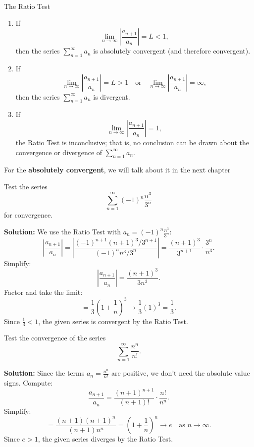 \documentclass[12pt]{article}
\theoremstyle{beautifulthm}
\begin{document}
\begin{mytheorem}{The Ratio Test}{}
    \begin{enumerate}
    \item[(i)] If 
    \[
    \lim_{n \to \infty} \left| \frac{a_{n+1}}{a_n} \right| = L < 1,
    \]
    then the series $\sum_{n=1}^\infty a_n$ is absolutely convergent (and therefore convergent).

    \item[(ii)] If 
    \[
    \lim_{n \to \infty} \left| \frac{a_{n+1}}{a_n} \right| = L > 1 \quad \text{or} \quad \lim_{n \to \infty} \left| \frac{a_{n+1}}{a_n} \right| = \infty,
    \]
    then the series $\sum_{n=1}^\infty a_n$ is divergent.

    \item[(iii)] If 
    \[
    \lim_{n \to \infty} \left| \frac{a_{n+1}}{a_n} \right| = 1,
    \]
    the Ratio Test is inconclusive; that is, no conclusion can be drawn about the convergence or divergence of $\sum_{n=1}^\infty a_n$.
\end{enumerate}
\end{mytheorem}

For the \textbf{absolutely convergent}, we will talk about it in the next chapter

\begin{tcolorbox}[colback=examplebg, colframe=red!75!black, title=\textbf{EXAMPLE 1: Using the Ratio Test}, fonttitle=\bfseries, sharp corners]
Test the series 
\[
\sum_{n=1}^\infty (-1)^n \frac{n^3}{3^n}
\]
for convergence.


\tcblower
\textbf{Solution:} 
We use the Ratio Test with $a_n = (-1)^n \frac{n^3}{3^n}$:
\[
\left| \frac{a_{n+1}}{a_n} \right| = \left| \frac{(-1)^{n+1}(n+1)^3 / 3^{n+1}}{(-1)^n n^3 / 3^n} \right| = \frac{(n+1)^3}{3^{n+1}} \cdot \frac{3^n}{n^3}.
\]
Simplify:
\[
\left| \frac{a_{n+1}}{a_n} \right| = \frac{(n+1)^3}{3n^3}.
\]
Factor and take the limit:
\[
= \frac{1}{3} \left( 1 + \frac{1}{n} \right)^3 \to \frac{1}{3} (1)^3 = \frac{1}{3}.
\]
Since $\frac{1}{3} < 1$, the given series is convergent by the Ratio Test.
\end{tcolorbox}



\begin{tcolorbox}[colback=examplebg, colframe=red!75!black, title=\textbf{EXAMPLE 2: Using the Ratio Test}, fonttitle=\bfseries, sharp corners]
Test the convergence of the series 
\[
\sum_{n=1}^\infty \frac{n^n}{n!}.
\]


\tcblower
\textbf{Solution:} 
Since the terms $a_n = \frac{n^n}{n!}$ are positive, we don’t need the absolute value signs. Compute:
\[
\frac{a_{n+1}}{a_n} = \frac{(n+1)^{n+1}}{(n+1)!} \cdot \frac{n!}{n^n}.
\]
Simplify:
\[
= \frac{(n+1)(n+1)^n}{(n+1)n^n} = \left( 1 + \frac{1}{n} \right)^n \to e \quad \text{as } n \to \infty.
\]
Since $e > 1$, the given series diverges by the Ratio Test.

\end{tcolorbox}
\end{document}
